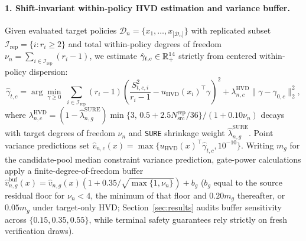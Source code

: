 \paragraph{1. Shift-invariant within-policy HVD estimation and variance buffer.}
Given evaluated target policies $\mathcal{D}_n = \{x_1,\dots,x_{|\mathcal{D}_n|}\}$ with replicated subset $\mathcal{I}_{\mathrm{rep}} = \{i : r_i \ge 2\}$ and total within-policy degrees of freedom $\nu_n = \sum_{i \in \mathcal{I}_{\mathrm{rep}}} (r_i - 1)$, we estimate $\hat{\gamma}_{t,c} \in \mathbb{R}_+^{14}$ strictly from centered within-policy dispersion:
\begin{equation}\label{eq:hvd_map}
  \hat{\gamma}_{t,c} = \arg\min_{\gamma \ge 0} \;
  \sum_{i \in \mathcal{I}_{\mathrm{rep}}} (r_i - 1)\left(\frac{S_{t,c,i}^2}{r_i - 1} - u_{\mathrm{HVD}}(x_i)^\top \gamma\right)^2
  + \lambda_{n,c}^{\mathrm{HVD}} \|\gamma - \gamma_{0,c}\|_2^2,
\end{equation}
where $\lambda_{n,c}^{\mathrm{HVD}} = (1 - \hat{\lambda}_{n,g}^{\mathrm{SURE}})\min\{3,\, 0.5 + 2.5 N_{\mathrm{src}}^{\mathrm{rep}}/36\} / (1 + 0.10 \nu_n)$ decays with target degrees of freedom $\nu_n$ and \texttt{SURE} shrinkage weight $\hat{\lambda}_{n,g}^{\mathrm{SURE}}$. Point variance predictions set $\hat{v}_{n,c}(x)=\max\{u_{\mathrm{HVD}}(x)^\top\hat{\gamma}_{t,c},10^{-10}\}$. Writing $m_g$ for the candidate-pool median constraint variance prediction, gate-power calculations apply a finite-degree-of-freedom buffer $\hat{v}_{n,g}^{\mathrm{buf}}(x) = \hat{v}_{n,g}(x)(1+0.35/\sqrt{\max\{1,\nu_n\}})+b_g$ ($b_g$ equal to the source residual floor for $\nu_n < 4$, the minimum of that floor and $0.20 m_g$ thereafter, or $0.05 m_g$ under target-only HVD; Section~\ref{sec:results} audits buffer sensitivity across $\{0.15, 0.35, 0.55\}$, while terminal safety guarantees rely strictly on fresh verification draws).

